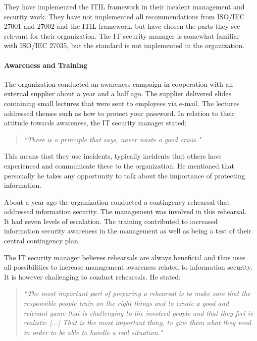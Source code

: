 They have implemented the \ac{ITIL} framework in their incident management and security work. They have not implemented all recommendations from \acs{ISO}/\acs{IEC} 27001 and 27002 and the \ac{ITIL} framework, but have chosen the parts they see relevant for their organization. The IT security manager is somewhat familiar with \acs{ISO}/\acs{IEC} 27035, but the standard is not implemented in the organization.

\paragraph{Awareness and Training}
The organization conducted an awareness campaign in cooperation with an external supplier about a year and a half ago. The supplier delivered slides containing small lectures that were sent to employees via e-mail. The lectures addressed themes such as how to protect your password. In relation to their attitude towards awareness, the IT security manager stated: 

\begin{quote}
\textit{``There is a principle that says, never waste a good crisis."}
\end{quote}

This means that they use incidents, typically incidents that others have experienced and communicate these to the organization. He mentioned that personally he takes any opportunity to talk about the importance of protecting information.

About a year ago the organization conducted a contingency rehearsal that addressed information security. The management was involved in this rehearsal. It had seven levels of escalation. The training contributed to increased information security awareness in the management as well as being a test of their central contingency plan.

The IT security manager believes rehearsals are always beneficial and thus uses all possibilities to increase management awareness related to information security. It is however challenging to conduct rehearsals. He stated:

\begin{quote}
\textit{``The most important part of preparing a rehearsal is to make sure that the responsible people train on the right things and to create a good and relevant game that is challenging to the involved people and that they feel is realistic [...] That is the most important thing, to give them what they need in order to be able to handle a real situation."}
\end{quote}

